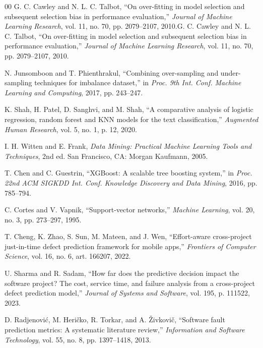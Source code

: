 \documentclass[conference,a4paper]{IEEEtran}
\newif\ifmarcarcambios
\newcommand{\cambio}[1]{\ifmarcarcambios\ifvmode\leavevmode\fi{\color{azulcambio}#1}\else#1\fi}
\begin{document}
\begin{thebibliography}{00}
 \cambio{G. C. Cawley and N. L. C. Talbot, ``On over-fitting in model selection and subsequent selection bias in performance evaluation,'' \textit{Journal of Machine Learning Research}, vol. 11, no. 70, pp. 2079--2107, 2010.}

 N. Junsomboon and T. Phienthrakul, ``Combining over-sampling and under-sampling techniques for imbalance dataset,'' in \textit{Proc. 9th Int. Conf. Machine Learning and Computing}, 2017, pp. 243--247.

 K. Shah, H. Patel, D. Sanghvi, and M. Shah, ``A comparative analysis of logistic regression, random forest and KNN models for the text classification,'' \textit{Augmented Human Research}, vol. 5, no. 1, p. 12, 2020.

 I. H. Witten and E. Frank, \textit{Data Mining: Practical Machine Learning Tools and Techniques}, 2nd ed. San Francisco, CA: Morgan Kaufmann, 2005.

 T. Chen and C. Guestrin, ``XGBoost: A scalable tree boosting system,'' in \textit{Proc. 22nd ACM SIGKDD Int. Conf. Knowledge Discovery and Data Mining}, 2016, pp. 785--794.

 C. Cortes and V. Vapnik, ``Support-vector networks,'' \textit{Machine Learning}, vol. 20, no. 3, pp. 273--297, 1995.

 T. Cheng, K. Zhao, S. Sun, M. Mateen, and J. Wen, ``Effort-aware cross-project just-in-time defect prediction framework for mobile apps,'' \textit{Frontiers of Computer Science}, vol. 16, no. 6, art. 166207, 2022.

 U. Sharma and R. Sadam, ``How far does the predictive decision impact the software project? The cost, service time, and failure analysis from a cross-project defect prediction model,'' \textit{Journal of Systems and Software}, vol. 195, p. 111522, 2023.

 D. Radjenovi{\'c}, M. Heri{\v c}ko, R. Torkar, and A. {\v Z}ivkovi{\v c}, ``Software fault prediction metrics: A systematic literature review,'' \textit{Information and Software Technology}, vol. 55, no. 8, pp. 1397--1418, 2013.

\end{thebibliography}
\end{document}
